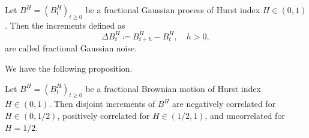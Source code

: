 \begin{defn}
    Let $B^{H}= (B_{t}^{H})_{t\geq 0}$ be a fractional Gaussian process of Hurst index $H\in (0,1)$. Then the increments defined as
    \begin{equation}
        \Delta B_{t}^{H}\coloneqq B_{t+h}^{H}-B_{t}^{H}, \quad h>0,
    \end{equation}
    are called fractional Gaussian noise.
\end{defn}
We have the following proposition.
\begin{prop}
    Let $B^{H}=(B_{t}^{H})_{t\geq 0}$ be a fractional Brownian motion of Hurst index $H\in (0,1)$. Then disjoint increments of $B^H$ are negatively correlated for $H\in (0,1/2)$, positively correlated for $H\in (1/2,1)$, and uncorrelated for $H=1/2$.
\end{prop}
